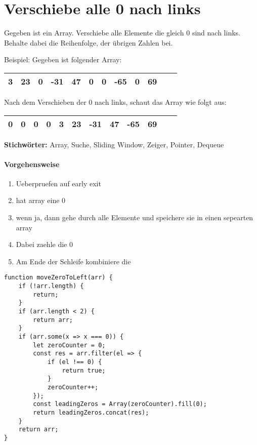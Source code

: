 \documentclass{book}
\begin{document}
\section{Verschiebe alle 0 nach links}
\begin{examplei}
	Gegeben ist ein Array. Verschiebe alle Elemente die gleich 0 sind nach links. Behalte dabei die Reihenfolge, der übrigen Zahlen bei.
	
	Beispiel:
	Gegeben ist folgender Array:
	
	\begin{tabular}{|l|l|l|l|l|l|l|l|l|l|l|l|} 
		\hline
		3 & 23 & 0 & -31 & 47 & 0 & 0 &-65 & 0 & 69 \\
		\hline
	\end{tabular}

	Nach dem Verschieben der 0 nach links, schaut das Array wie folgt aus:
	
	\begin{tabular}{|l|l|l|l|l|l|l|l|l|l|l|l|} 
		\hline
		0 & 0 & 0 & 0 & 3 & 23 & -31 & 47 & -65 & 69 \\
		\hline
	\end{tabular}
	
	
\end{examplei}
{\bf Stichwörter:} Array, Suche, Sliding Window, Zeiger, Pointer, Dequeue

\paragraph{Vorgehensweise}
\begin{enumerate} 
	\item Ueberpruefen auf early exit
	\item hat array eine 0
	\item wenn ja, dann gehe durch alle Elemente und speichere sie in einen sepearten array
	\item Dabei zaehle die 0
	\item Am Ende der Schleife kombiniere die 
\end{enumerate}

\begin{lstlisting}[caption=My Javascript Example]
function moveZeroToLeft(arr) {
	if (!arr.length) {
		return;
	}
	if (arr.length < 2) {
		return arr;
	}
	if (arr.some(x => x === 0)) {
		let zeroCounter = 0;
		const res = arr.filter(el => {
			if (el !== 0) {
				return true;
			}
			zeroCounter++;
		});
		const leadingZeros = Array(zeroCounter).fill(0);
		return leadingZeros.concat(res);
	}
	return arr;
}
\end{lstlisting}
\end{document}
